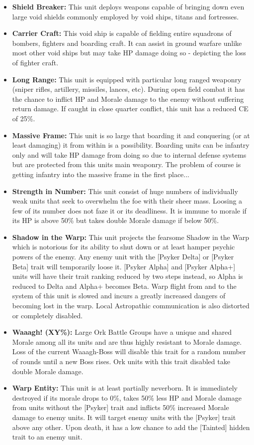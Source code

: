 \begin{itemize}
 	\item \textbf{Shield Breaker:} This unit deploys weapons capable of bringing down even large void shields commonly employed by void ships, titans and fortresses.
 	\item \textbf{Carrier Craft:} This void ship is capable of fielding entire squadrons of bombers, fighters and boarding craft. It can assist in ground warfare unlike most other void ships but may take HP damage doing so - depicting the loss of fighter craft.
 	\item \textbf{Long Range:} This unit is equipped with particular long ranged weaponry (sniper rifles, artillery, missiles, lances, etc). During open field combat it has the chance to inflict HP and Morale damage to the enemy without suffering return damage. If caught in close quarter conflict, this unit has a reduced CE of 25\%.
 	\item \textbf{Massive Frame:} This unit is so large that boarding it and conquering (or at least damaging) it from within is a possibility. Boarding units can be infantry only and will take HP damage from doing so due to internal defense systems but are protected from this units main weaponry. The problem of course is getting infantry into the massive frame in the first place...
 	\item \textbf{Strength in Number:} This unit consist of huge numbers of individually weak units that seek to overwhelm the foe with their sheer mass. Loosing a few of its number does not faze it or its deadliness. It is immune to morale if its HP is above 50\% but takes double Morale damage if below 50\%.
 	\item \textbf{Shadow in the Warp:} This unit projects the fearsome Shadow in the Warp which is notorious for its ability to shut down or at least hamper psychic powers of the enemy. Any enemy unit with the [Psyker Delta] or [Psyker Beta] trait will temporarily loose it. [Psyker Alpha] and [Psyker Alpha+] units will have their trait ranking reduced by two steps instead, so Alpha is reduced to Delta and Alpha+ becomes Beta. Warp flight from and to the system of this unit is slowed and incurs a greatly increased dangers of becoming lost in the warp. Local Astropathic communication is also distorted or completely disabled.
 	\item \textbf{Waaagh! (XY\%):} Large Ork Battle Groups have a unique and shared Morale among all its units and are thus highly resistant to Morale damage. Loss of the current Waaagh-Boss will disable this trait for a random number of rounds until a new Boss rises. Ork units with this trait disabled take double Morale damage.
 	\item \textbf{Warp Entity:} This unit is at least partially neverborn. It is immediately destroyed if its morale drops to 0\%, takes 50\% less HP and Morale damage from units without the [Psyker] trait and inflicts 50\% increased Morale damage to enemy units. It will target enemy units with the [Psyker] trait above any other. Upon death, it has a low chance to add the [Tainted] hidden trait to an enemy unit.
\end{itemize}

